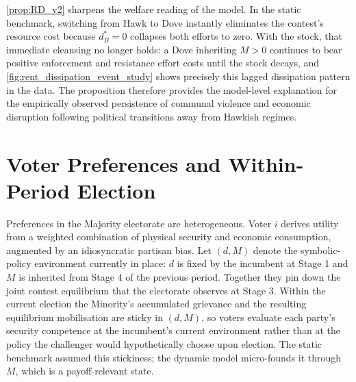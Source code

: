 \documentclass[11pt,twoside]{extarticle}
\begin{document}
\autoref{prop:RD_v2} sharpens the welfare reading of the model. In the static benchmark, switching from Hawk to Dove instantly eliminates the contest's resource cost because $d_B^*=0$ collapses both efforts to zero. With the stock, that immediate cleansing no longer holds: a Dove inheriting $M>0$ continues to bear positive enforcement and resistance effort costs until the stock decays, and \autoref{fig:rent_dissipation_event_study} shows precisely this lagged dissipation pattern in the data. The proposition therefore provides the model-level explanation for the empirically observed persistence of communal violence and economic disruption following political transitions away from Hawkish regimes.

\section{Voter Preferences and Within-Period Election}\label{sec:voter_v2}

Preferences in the Majority electorate are heterogeneous. Voter $i$ derives utility from a weighted combination of physical security and economic consumption, augmented by an idiosyncratic partisan bias. Let $(d,M)$ denote the symbolic-policy environment currently in place: $d$ is fixed by the incumbent at Stage 1 and $M$ is inherited from Stage 4 of the previous period. Together they pin down the joint contest equilibrium that the electorate observes at Stage 3. Within the current election the Minority's accumulated grievance and the resulting equilibrium mobilisation are sticky in $(d,M)$, so voters evaluate each party's security competence at the incumbent's current environment rather than at the policy the challenger would hypothetically choose upon election. The static benchmark assumed this stickiness; the dynamic model micro-founds it through $M$, which is a payoff-relevant state.
\end{document}
